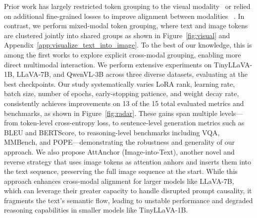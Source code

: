 \documentclass[11pt]{article}
\begin{document}
Prior work has largely restricted token grouping to the visual modality~\citep{huang2024efficient, cao2023pumer, fan2024semantic} or relied on additional fine-grained losses to improve alignment between modalities~\citep{yin2024sea, bica2024improving, mukhoti2023open} . In contrast, we perform mixed-modal token grouping, where text and image tokens are clustered jointly into shared groups as shown in Figure~\ref{fig:visual} and Appendix~\ref{app:visualize_text_into_image}. To the best of our knowledge, this is among the first works to explore explicit cross-modal grouping, enabling more direct multimodal interaction. We perform extensive experiments on TinyLLaVA-1B, LLaVA-7B, and QwenVL-3B across three diverse datasets, evaluating at the best checkpoints. Our study systematically varies LoRA rank, learning rate, batch size, number of epochs, early-stopping patience, and weight decay rate, consistently achieves improvements on 13 of the 15 total evaluated metrics and benchmarks, as shown in Figure~\ref{fig:radar}. These gains span multiple levels—from token-level cross-entropy loss, to sentence-level generation metrics such as BLEU and BERTScore, to reasoning-level benchmarks including VQA, MMBench, and POPE—demonstrating the robustness and generality of our approach. We also propose AttAnchor (Image-into-Text), another novel and reverse strategy that uses image tokens as attention anhors and inserts them into the text sequence, preserving the full image sequence at the start. While this approach enhances cross-modal alignment for larger models like LLaVA-7B, which can leverage their greater capacity to handle disrupted prompt causality, it fragments the text's semantic flow, leading to unstable performance and degraded reasoning capabilities in smaller models like TinyLLaVA-1B. 
\vspace{-0.5cm}
\end{document}
